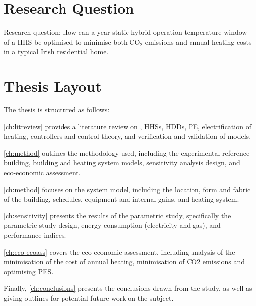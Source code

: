\section{Research Question} 
Research question: How can a year-static hybrid operation temperature window of a \ac{HHS} be optimised to minimise both $\text{CO}_2$ emissions and annual heating costs in a typical Irish residential home.

\section{Thesis Layout}
The thesis is structured as follows: 

\cref{ch:litreview} provides a literature review on \HPs,  \acp{HHS}, \acp{HDD}, \ac{PE}, electrification of heating, controllers and control theory, and verification and validation of models.

\cref{ch:method} outlines the methodology used, including the experimental reference building, building and heating system models, sensitivity analysis design, and eco-economic assessment. 

\cref{ch:method} focuses on the system model, including the location, form and fabric of the building, schedules, equipment and internal gains, and heating system. 

\cref{ch:sensitivity} presents the results of the parametric study, specifically the parametric study design, energy consumption (electricity and gas), and performance indices. 

\cref{ch:eco-ecoass} covers the eco-economic assessment, including analysis of the minimisation of the cost of annual heating, minimisation of $\text{CO}2$ emissions and optimising \ac{PES}.

Finally, \cref{ch:conclusions} presents the conclusions drawn from the study, as well as giving outlines for potential future work on the subject.
